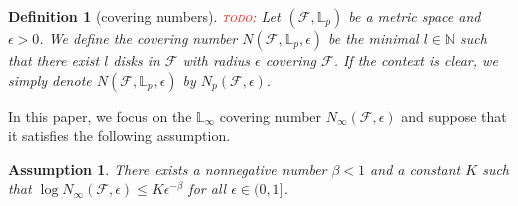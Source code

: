 \documentclass[letterpaper]{article} %
\newtheorem{definition}{Definition}
\newtheorem{assumption}{Assumption}
\newcommand{\real}{\mathbb{R}}
\newcommand{\lebesgue}{\mathbb{L}}
\newcommand{\complexbound}{\beta}
\newcommand{\red}[1]{\textcolor{red}{#1}}
\newcommand{\todo}[1]{\red{\textsc{todo:} #1}}
\begin{document}
\begin{definition}[covering numbers]
\todo{\cite{wang2017learning}}
Let $(\mathcal{F}, \lebesgue{}_p)$ be a metric space and $\epsilon>0$. We define the covering number $N(\mathcal{F},\lebesgue{}_p,\epsilon)$ be the minimal $l\in\mathbb{N}$ such that there exist $l$ disks in $\mathcal{F}$ with radius $\epsilon$ covering $\mathcal{F}$. If the context is clear, we simply denote $N(\mathcal{F},\lebesgue{}_p, \epsilon)$ by $N_p(\mathcal{F},\epsilon)$.


\end{definition}

In this paper, we focus on the $\lebesgue_\infty$ covering number $N_\infty(\mathcal{F},\epsilon)$ and suppose that it satisfies the following assumption.

\begin{assumption}\label{ass:covering_number} 
There exists a nonnegative number $\complexbound < 1$ and a constant $K$ such that $\log N_\infty(\mathcal{F},\epsilon) \le K\epsilon^{-\complexbound}$ for all $\epsilon\in (0,1]$. 
\end{assumption}
\end{document}
